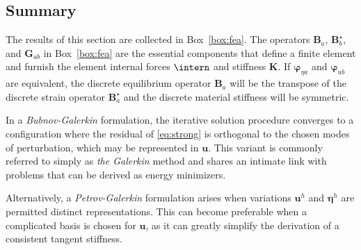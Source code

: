 \subsection{Summary}

  The results of this section are collected in Box~\ref{box:fea}.
  The operators \(\bm{B}_a\),     \(\bm{B}^\star_b\), and \(\bm{G}_{ab}\) 
  in Box~\ref{box:fea} are the essential components that define a finite element and furnish the element internal forces \(\intern\) and stiffness \(\mathbf{K}\).
  If \(\bm{\varphi}_{\eta a}\) and \(\bm{\varphi}_{u b}\) are
  equivalent, the discrete equilibrium operator \(\bm{B}_a\) 
  will be the transpose of the
  discrete strain operator \(\bm{B}^\star_a\)
  and the discrete material stiffness will be 
  symmetric.

  In a \emph{Bubnov-Galerkin} formulation, the iterative solution procedure
  converges to a configuration where the residual of \eqref{eq:strong}
  is orthogonal to the chosen modes of perturbation, which may be represented in
  \(\bm{u}\).
  This variant is
  commonly referred to simply as \emph{the Galerkin} method and shares
  an intimate link with problems that can be derived as energy
  minimizers.

  Alternatively, a \emph{Petrov-Galerkin} formulation arises when
  variations \(\bm{u}^h\) and \(\bm{\eta}^h\) are permitted distinct
  representations. This can become preferable when a complicated basis
  is chosen for \(\bm{u}\), as it can greatly simplify the derivation of
  a consistent tangent stiffness.

